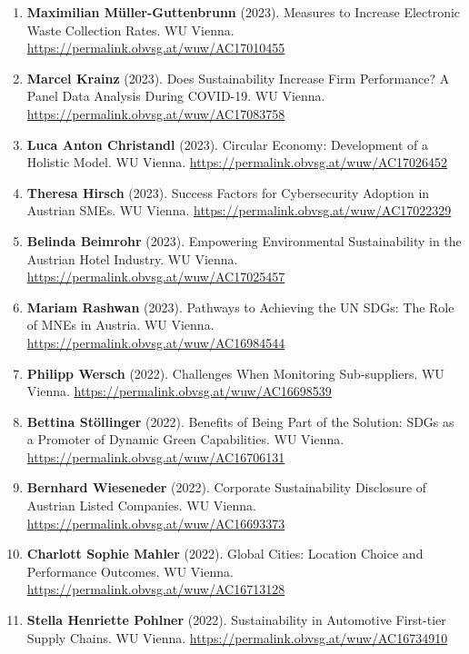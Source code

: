 \documentclass[11pt,a4paper]{article}
\begin{document}
\begin{cv}
\begin{enumerate}
    \item \textbf{Maximilian Müller-Guttenbrunn} (2023). Measures to Increase Electronic Waste Collection Rates. WU Vienna. \url{https://permalink.obvsg.at/wuw/AC17010455}
    
    \item \textbf{Marcel Krainz} (2023). Does Sustainability Increase Firm Performance? A Panel Data Analysis During COVID-19. WU Vienna. \url{https://permalink.obvsg.at/wuw/AC17083758}
    
    \item \textbf{Luca Anton Christandl} (2023). Circular Economy: Development of a Holistic Model. WU Vienna. \url{https://permalink.obvsg.at/wuw/AC17026452}
    
    \item \textbf{Theresa Hirsch} (2023). Success Factors for Cybersecurity Adoption in Austrian SMEs. WU Vienna. \url{https://permalink.obvsg.at/wuw/AC17022329}
    
    \item \textbf{Belinda Beimrohr} (2023). Empowering Environmental Sustainability in the Austrian Hotel Industry. WU Vienna. \url{https://permalink.obvsg.at/wuw/AC17025457}
    
    \item \textbf{Mariam Rashwan} (2023). Pathways to Achieving the UN SDGs: The Role of MNEs in Austria. WU Vienna. \url{https://permalink.obvsg.at/wuw/AC16984544}
    
    \item \textbf{Philipp Wersch} (2022). Challenges When Monitoring Sub-suppliers. WU Vienna. \url{https://permalink.obvsg.at/wuw/AC16698539}
    
    \item \textbf{Bettina Stöllinger} (2022). Benefits of Being Part of the Solution: SDGs as a Promoter of Dynamic Green Capabilities. WU Vienna. \url{https://permalink.obvsg.at/wuw/AC16706131}
    
    \item \textbf{Bernhard Wieseneder} (2022). Corporate Sustainability Disclosure of Austrian Listed Companies. WU Vienna. \url{https://permalink.obvsg.at/wuw/AC16693373}
    
    \item \textbf{Charlott Sophie Mahler} (2022). Global Cities: Location Choice and Performance Outcomes. WU Vienna. \url{https://permalink.obvsg.at/wuw/AC16713128}
    
    \item \textbf{Stella Henriette Pohlner} (2022). Sustainability in Automotive First-tier Supply Chains. WU Vienna. \url{https://permalink.obvsg.at/wuw/AC16734910}
    

\end{enumerate}
\end{cv}
\end{document}
